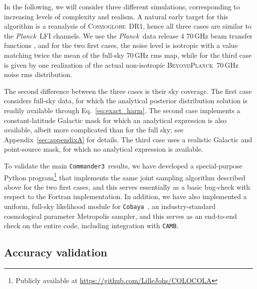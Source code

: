 \documentclass[twocolumn]{aa}
\def\planck{\emph{Planck}}
\def\Planck{\emph{Planck}}
\def\commanderthree{\texttt{Commander3}}
\def\cobaya{\texttt{Cobaya}}
\def\camb{\texttt{CAMB}}
\newcommand{\BP}{\textsc{BeyondPlanck}}
\newcommand{\cosmoglobe}{\textsc{Cosmoglobe}}
\begin{document}
In the following, we will consider three different simulations, corresponding to increasing levels of complexity and realism. A natural early target for this algorithm is a reanalysis of \cosmoglobe\ DR1, hence all three cases are similar to the \Planck\ LFI channels. We use the \planck\ data release 4 70\,GHz beam transfer functions \citep{planck2020-LVII}, and for the two first cases, the noise level is isotropic with a value matching twice the mean of the full-sky 70\,GHz rms map, while for the third case is given by one realization of the actual non-isotropic \BP\ 70\,GHz noise rms distribution.

The second difference between the three cases is their sky coverage. The first case considers full-sky data, for which the analytical posterior distribution solution is readily available through Eq.~\eqref{eq:exact_harm}. The second case implements a constant-latitude Galactic mask for which an analytical expression is also available, albeit more complicated than for the full sky; see Appendix~\ref{sec:appendixA} for details. The third case uses a realistic Galactic and point-source mask, for which no analytical expression is available. 

To validate the main \commanderthree\ results, we have developed a special-purpose Python program\footnote{Publicly available at \url{https://github.com/LilleJohs/COLOCOLA}} that implements the same joint sampling algorithm described above for the two first cases, and this serves essentially as a basic bug-check with respect to the Fortran implementation. In addition, we have also implemented a uniform, full-sky likelihood module for \cobaya\ \citep{Torrado:2020dgo}, an industry-standard cosmological parameter Metropolis sampler, and this serves as an end-to-end check on the entire code, including integration with \camb.

\subsection{Accuracy validation}
\end{document}
